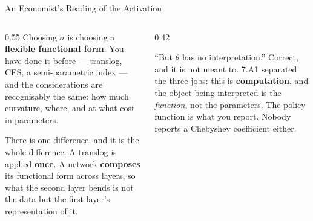 \begin{frame}{An Economist's Reading of the Activation}
\begin{columns}[T]
\begin{column}{0.55\textwidth}
\small
Choosing $\sigma$ is choosing a \textbf{flexible functional form}. You have done it before --- translog, CES, a semi-parametric index --- and the considerations are recognisably the same: how much curvature, where, and at what cost in parameters.
\medskip

There is one difference, and it is the whole difference. A translog is applied \textbf{once}. A network \textbf{composes} its functional form across layers, so what the second layer bends is not the data but the first layer's representation of it.
\end{column}
\begin{column}{0.42\textwidth}
\begin{conceptbox}[title=\textbf{And the classical objection}]\small
``But $\theta$ has no interpretation.'' Correct, and it is not meant to. 7.A1 separated the three jobs: this is \textbf{computation}, and the object being interpreted is the \emph{function}, not the parameters.
\medskip
The policy function is what you report. Nobody reports a Chebyshev coefficient either.
\end{conceptbox}
\end{column}
\end{columns}
\end{frame}

